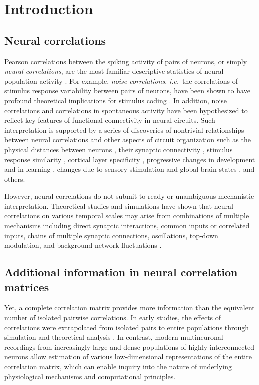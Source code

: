\documentclass[10pt]{article}
\begin{document}
\section*{Introduction}
\subsection*{Neural correlations}
Pearson correlations between the spiking activity of pairs of neurons, or simply \emph{neural correlations}, are the most familiar descriptive statistics of neural population activity \cite{Averbeck:2006,Zohary:1994,Kohn:2005,Bair:2001,Ecker:2010}.  For example, \emph{noise correlations}, \emph{i.e.}~the correlations of stimulus response variability between pairs of neurons, have been shown to have profound theoretical implications for stimulus coding \cite{Zohary:1994,Abbott:1999,Sompolinsky:2001,Wilke:2002,Averbeck:2006,Josic:2009,Berens:2011,Ecker:2011}. In addition, noise correlations and correlations in spontaneous activity have been hypothesized to reflect key features of functional connectivity in neural circuits.  Such interpretation is supported by a series of discoveries of nontrivial relationships between neural correlations and other aspects of circuit organization such as the physical distances between neurons \cite{Smith:2008,Denman:2013}, their synaptic connectivity \cite{Ko:2011},  stimulus response similarity \cite{Bair:2001,Arieli:1995,Chiu:2002,Kenet:2003,Kohn:2005,Cohen:2008,Cohen:2009,Ko:2011,Smith:2013b}, cortical layer specificity \cite{Hansen:2012,Smith:2013}, progressive changes in development and in learning \cite{Golshani:2009,Gu:2011}, changes due to sensory stimulation and global brain states \cite{Goard:2009,Kohn:2009,Ecker:2010,Renart:2010}, and others.

However, neural correlations do not submit to ready or unambiguous mechanistic interpretation.  Theoretical studies and simulations have shown that neural correlations on various temporal scales may arise from combinations of multiple mechanisms including  direct synaptic interactions, common inputs or correlated inputs, chains of multiple synaptic connections, oscillations, top-down modulation, and background network fluctuations \cite{Perkel:1967b,Moore:1970,Shadlen:1998,Salinas:2001,Ostojic:2009,Rosenbaum:2011}. 

\subsection*{Additional information in neural correlation matrices}
Yet, a complete correlation matrix provides more information than the equivalent number of isolated pairwise correlations. In early studies, the effects of correlations were extrapolated from isolated pairs to entire populations through simulation and theoretical analysis \cite{Shadlen:1998,Zohary:1994}. In contrast, modern multineuronal recordings from increasingly large and dense populations of highly interconnected neurons allow estimation of various low-dimensional representations of the entire correlation matrix, which can enable inquiry into the nature of underlying physiological mechanisms and computational principles.  
\end{document}
